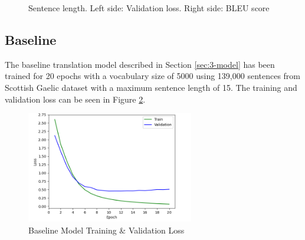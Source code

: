 \begin{figure}[ht!]
\centering
{}
\captionsetup{justification=centering}
\caption[Sentence length validation loss and BLEU score]{Sentence length. Left side: Validation loss. Right side: BLEU score}
\label{fig:length_loss_bleu}
\end{figure}


\subsection{Baseline}
\label{sec:4-baseline}

The baseline translation model described in Section \ref{sec:3-model} has been trained for 20 epochs with a vocabulary size of 5000 using 139,000 sentences from Scottish Gaelic dataset with a maximum sentence length of 15. The training and validation loss can be seen in Figure \ref{fig:loss_baseline}.

\begin{figure}[ht!]
\centering
\includegraphics[width=0.65\textwidth]{media/experiments/loss/5k/loss_baseline.png}
\captionsetup{justification=centering}
\caption[Baseline Model Training \& Validation Loss]{Baseline Model Training \& Validation Loss}
\label{fig:loss_baseline}
\end{figure}

